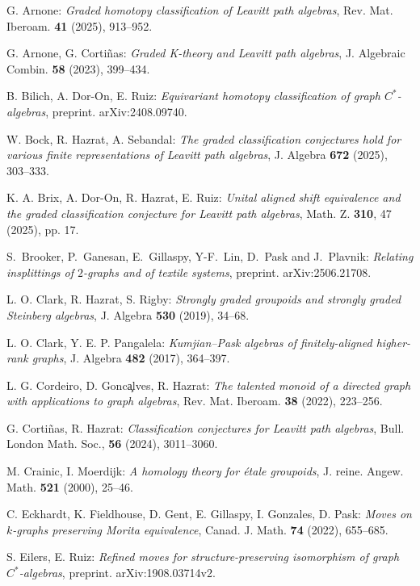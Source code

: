 \documentclass[12pt]{amsart}
\theoremstyle{definition}
\theoremstyle{remark}
\begin{document}
\begin{thebibliography}{}
G. Arnone: \emph{Graded homotopy classification of Leavitt path algebras}, Rev. Mat. Iberoam. {\bf 41} (2025), 913--952.

G. Arnone, G. Corti\~nas: \emph{Graded K-theory and Leavitt path algebras}, J. Algebraic Combin. {\bf 58} (2023), 399--434.

B. Bilich, A. Dor-On, E. Ruiz: \emph{Equivariant homotopy classification of graph $C^*$-algebras}, preprint. arXiv:2408.09740.

W. Bock, R. Hazrat, A. Sebandal: \emph{The graded classification conjectures hold for various finite representations of Leavitt path algebras}, J. Algebra {\bf 672} (2025), 303--333.

K. A. Brix, A. Dor-On, R. Hazrat, E. Ruiz: \emph{Unital aligned shift equivalence and the graded classification conjecture for Leavitt path algebras}, Math. Z. \textbf{310}, 47 (2025), pp. 17.

S.\ Brooker, P.\ Ganesan, E.\ Gillaspy, Y-F.\ Lin, D.\ Pask and J.\ Plavnik: \emph{Relating insplittings of $2$-graphs and of textile systems}, preprint. arXiv:2506.21708. 

L. O. Clark, R. Hazrat, S. Rigby: \emph{Strongly graded groupoids and strongly graded Steinberg algebras}, J. Algebra \textbf{530} (2019), 34--68. 

L. O. Clark, Y. E. P. Pangalela: \emph{Kumjian--Pask algebras of finitely-aligned higher-rank graphs}, J. Algebra \textbf{482} (2017), 364--397.

L. G. Cordeiro, D. Gonc\c alves, R. Hazrat: \emph{The talented monoid of a directed graph with applications to graph algebras}, Rev. Mat. Iberoam. \textbf{38} (2022), 223--256.

G. Corti\~nas, R. Hazrat: \emph{Classification conjectures for Leavitt path algebras}, Bull. London Math. Soc., \textbf{56} (2024), 3011--3060.

M. Crainic, I. Moerdijk: \emph{A homology theory for \'{e}tale groupoids}, J. reine. Angew. Math. \textbf{521} (2000), 25--46. 

C. Eckhardt, K. Fieldhouse, D. Gent, E. Gillaspy, I. Gonzales, D. Pask: \emph{Moves on $k$-graphs preserving Morita equivalence}, Canad. J. Math. \textbf{74} (2022), 655--685.

S. Eilers, E. Ruiz:  \emph{Refined moves for structure-preserving isomorphism of graph 
$C^*$-algebras}, preprint. arXiv:1908.03714v2.


\end{thebibliography}
\end{document}
